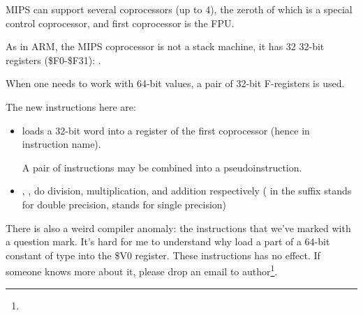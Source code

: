 
MIPS can support several coprocessors (up to 4), 
the zeroth of which is a special control coprocessor,
and first coprocessor is the FPU.

As in ARM, the MIPS coprocessor is not a stack machine, it has 32 32-bit registers (\$F0-\$F31):
.

When one needs to work with 64-bit \Tdouble values, a pair of 32-bit F-registers is used.



The new instructions here are:

\begin{itemize}

\item {} loads a 32-bit word into a register of the first coprocessor (hence  in instruction name).

A pair of  instructions may be combined into a  pseudoinstruction.

\item {}, ,  do division, multiplication, and addition respectively 
( in the suffix stands for double precision,  stands for single precision)

\end{itemize}

\myindex{\CompilerAnomaly}
\label{MIPS_FPU_LUI}

There is also a weird compiler anomaly: the  instructions that we've marked with a question mark.
It's hard for me to understand why load a part of a 64-bit constant of \Tdouble type into the \$V0 register.
These instructions has no effect.
If someone knows more about it, please drop an email to author\footnote{\EMAIL}.

